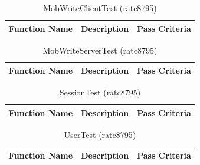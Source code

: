 \documentclass[14pt, a4paper]{article}
\begin{document}
\begin{table}[h]
	\centering
	\caption{MobWriteClientTest (ratc8795)}
	\begin{tabular}{|p{4cm}|p{5cm}|p{6cm}|}
		\hline
		\textbf{Function Name} & \textbf{Description} & \textbf{Pass Criteria}  \\\hline
	\end{tabular}
\end{table}
\begin{table}[h]
	\centering
	\caption{MobWriteServerTest (ratc8795)}
	\begin{tabular}{|p{4cm}|p{5cm}|p{6cm}|}
		\hline
		\textbf{Function Name} & \textbf{Description} & \textbf{Pass Criteria}  \\\hline
	\end{tabular}
\end{table}
\begin{table}[h]
	\centering
	\caption{SessionTest (ratc8795)}
	\begin{tabular}{|p{4cm}|p{5cm}|p{6cm}|}
		\hline
		\textbf{Function Name} & \textbf{Description} & \textbf{Pass Criteria}  \\\hline
	\end{tabular}
\end{table}
\begin{table}[h]
	\centering
	\caption{UserTest (ratc8795)}
	\begin{tabular}{|p{4cm}|p{5cm}|p{6cm}|}
		\hline
		\textbf{Function Name} & \textbf{Description} & \textbf{Pass Criteria}  \\\hline
	\end{tabular}
\end{table}
\end{document}
